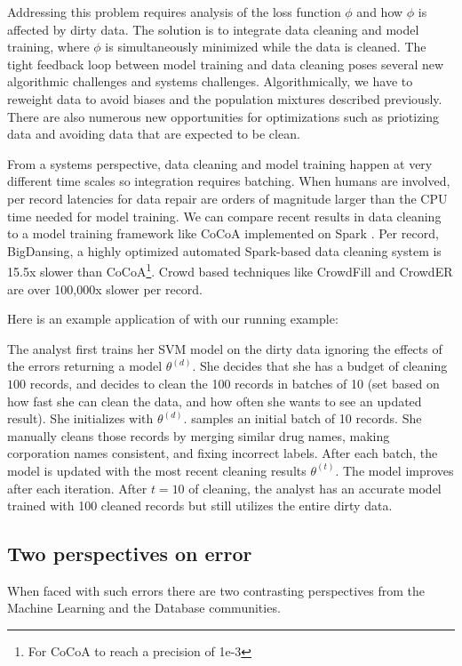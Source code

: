 Addressing this problem requires analysis of the loss function $\phi$ and how $\phi$ is affected by dirty data.
The solution is to integrate data cleaning and model training, where $\phi$ is simultaneously minimized while the data is cleaned.
The tight feedback loop between model training and data cleaning poses several new algorithmic challenges and systems challenges.
Algorithmically,  we have to reweight data to avoid biases and the population mixtures described previously.
There are also numerous new opportunities for optimizations such as priotizing data and avoiding data that are expected to be clean.

From a systems perspective, data cleaning and model training happen at very different time scales so integration requires batching.
When humans are involved, per record latencies for data repair are orders of magnitude larger than the CPU time needed for model training.
We can compare recent results in data cleaning to a model training framework like CoCoA implemented on Spark \cite{jaggi2014communication}.
Per record, BigDansing, a highly optimized automated Spark-based data cleaning system is 15.5x slower than CoCoA\footnote{For CoCoA to reach a precision of 1e-3}.
Crowd based techniques like CrowdFill \cite{park2014crowdfill} and CrowdER \cite{wang2012crowder} are over 100,000x slower per record. 

\iffalse
Here is an example application of \sys with our running example:
\begin{example}
The analyst first trains her SVM model on the dirty data ignoring the effects of the errors returning a model $\theta^{(d)}$.
She decides that she has a budget of cleaning $100$ records, and decides to clean the 100 records in batches of 10 (set based on how fast she can clean the data, and how often she wants to see an updated result).
She initializes \sys with $\theta^{(d)}$.
\sys samples an initial batch of 10 records.
She manually cleans those records by merging similar drug names, making corporation names consistent, and fixing incorrect labels.
After each batch, the model is updated with the most recent cleaning results $\theta^{(t)}$.
The model improves after each iteration.
After $t=10$ of cleaning, the analyst has an accurate model trained with 100 cleaned records but still utilizes the entire dirty data.
\end{example}



\subsection{Two perspectives on error}
When faced with such errors there are two contrasting perspectives from the Machine Learning and the Database communities.

